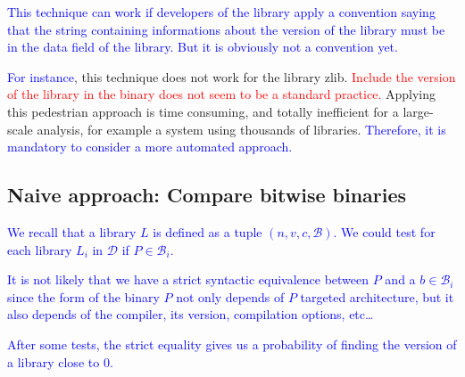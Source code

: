 \documentclass{article}
\newcommand{\ludo}[1]{\textcolor{blue}{#1}}
\newcommand{\thom}[1]{\textcolor{red}{#1}}
\begin{document}
        \ludo{This technique can work if developers of the library apply a
        convention saying that the string containing informations about the
        version of the library must be in the data field of the library. But
        it is obviously not a convention yet.}

        \ludo{For instance}, this technique does not work for the library zlib. 
        \thom{Include the version of the library in the binary does not seem
        to be a standard practice.}
        Applying this pedestrian approach is time consuming, and totally
        inefficient for a large-scale analysis, for example a system using
        thousands of libraries. \ludo{Therefore, it is mandatory to consider a
        more automated approach.}

    

    \subsection{Naive approach: Compare bitwise binaries }
    \label{naive-notations}

    \ludo{We recall that a library $L$ is defined as a tuple $(n, v, c,
    \mathcal{B})$. We could test for each library $L_i$ in $\mathcal{D}$ if $P \in
    \mathcal{B}_i$.} 

    \ludo{It is not likely that we have a strict syntactic equivalence between
    $P$ and a $b \in \mathcal{B}_i$ since the form of the binary $P$ not only
    depends of $P$ targeted architecture, but it also depends of the compiler,
    its version, compilation options, etc\dots}

    \ludo{After some tests, the strict equality gives us a probability of
    finding the version of a library close to $0$.}
\end{document}
